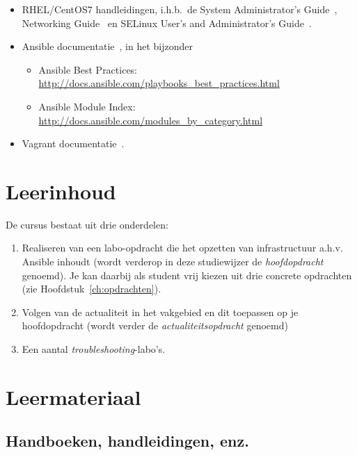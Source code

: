 \begin{itemize}
  \item RHEL/CentOS7 handleidingen, i.h.b.~de System Administrator's Guide~\autocite{SvistunovEtAl2016}, Networking Guide~\autocite{JahodaEtAl2016} en SELinux User's and Administrator's Guide~\autocite{JahodaEtAl2016a}.
  \item Ansible documentatie~\autocite{Ansible2016}, in het bijzonder
  
  \begin{itemize}
    \item Ansible Best Practices: \url{http://docs.ansible.com/playbooks_best_practices.html}
    \item Ansible Module Index: \url{http://docs.ansible.com/modules_by_category.html}
  \end{itemize}
  \item Vagrant documentatie~\autocite{Hashicorp}.
\end{itemize}

\section{Leerinhoud}
\label{sec:leerinhoud}

De cursus bestaat uit drie onderdelen:

\begin{enumerate}
  \item Realiseren van een labo-opdracht die het opzetten van infrastructuur a.h.v. Ansible inhoudt (wordt verderop in deze studiewijzer de \emph{hoofdopdracht} genoemd). Je kan daarbij als student vrij kiezen uit drie concrete opdrachten (zie Hoofdstuk~\ref{ch:opdrachten}).
  \item Volgen van de actualiteit in het vakgebied en dit toepassen op je hoofdopdracht (wordt verder de \emph{actualiteitsopdracht} genoemd)
  \item Een aantal \emph{troubleshooting}-labo's.
\end{enumerate}

\section{Leermateriaal}
\label{sec:leermateriaal}

\subsection{Handboeken, handleidingen, enz.}
\label{ssec:handboeken}

